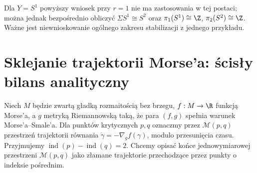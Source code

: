 \begin{przyklad}
Dla $Y=S^1$ powyższy wniosek przy $r=1$ nie ma zastosowania
w tej postaci; można jednak bezpośrednio obliczyć
$\Sigma S^1\cong S^2$ oraz
$\pi_1(S^1)\cong\Z$, $\pi_2(S^2)\cong\Z$.
Ważne jest niewnioskowanie ogólnego zakresu stabilizacji
z jednego przykładu.
\end{przyklad}

\section{Sklejanie trajektorii Morse'a: ścisły bilans analityczny}
Niech $M$ będzie zwartą gładką rozmaitością bez brzegu,
$f:M\to\R$ funkcją Morse'a, a $g$ metryką Riemannowską
taką, że para $(f,g)$ spełnia warunek Morse'a--Smale'a.
Dla punktów krytycznych $p,q$ oznaczmy przez
$\mathcal M(p,q)$ przestrzeń trajektorii równania
$\dot\gamma=-\nabla_g f(\gamma)$, modulo przesunięcia czasu.
Przyjmujemy $\operatorname{ind}(p)-\operatorname{ind}(q)=2$.
Chcemy opisać końce jednowymiarowej przestrzeni
$\mathcal M(p,q)$ jako złamane trajektorie przechodzące
przez punkty o indeksie pośrednim.

